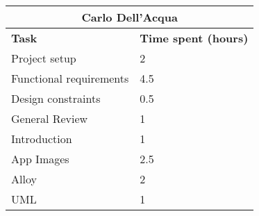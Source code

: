\begin{table}[h]
  \centering
  \begin{tabular}{l|l}
    \multicolumn{2}{c}{\textbf{Carlo Dell'Acqua}} \\
    \hline
    \textbf{Task} & \textbf{Time spent (hours)}\\
    \hline
    Project setup & 2 \\
    Functional requirements & 4.5 \\
    Design constraints & 0.5 \\
    General Review & 1 \\
    Introduction & 1 \\
    App Images & 2.5 \\
    Alloy & 2 \\
    UML & 1 \\
  \end{tabular}
\end{table}